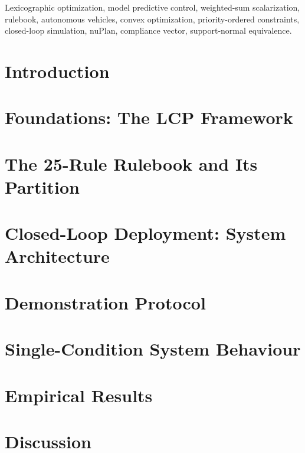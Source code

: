 \documentclass[journal, twocolumn]{IEEEtran}
\begin{document}
\begin{IEEEkeywords}
Lexicographic optimization, model predictive control, weighted-sum scalarization, rulebook, autonomous vehicles, convex optimization, priority-ordered constraints, closed-loop simulation, nuPlan, compliance vector, support-normal equivalence.
\end{IEEEkeywords}


\section{Introduction}
\label{sec:introduction}


\section{Foundations: The LCP Framework}
\label{sec:foundations}


\section{The 25-Rule Rulebook and Its Partition}
\label{sec:rulebook}


\section{Closed-Loop Deployment: System Architecture}
\label{sec:deployment}


\section{Demonstration Protocol}
\label{sec:protocol}


\section{Single-Condition System Behaviour}
\label{sec:singlecondition}


\section{Empirical Results}
\label{sec:results}


\section{Discussion}
\label{sec:discussion}

\end{document}
